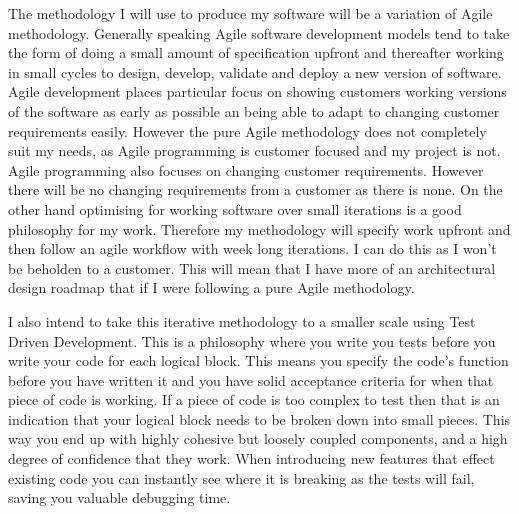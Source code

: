 The methodology I will use to produce my software will be a variation of
Agile methodology. Generally speaking Agile software development models tend to take
the form of doing a small amount of specification upfront and thereafter working
in small cycles to design, develop, validate and deploy a new version of
software. Agile development places particular focus on showing customers working
versions of the software as early as possible an being able to adapt to changing
customer requirements easily. \cite{fowler2001agile}
However the pure Agile methodology does not completely suit my needs, as Agile
programming is customer focused and my project is not. Agile programming also
focuses on changing customer requirements. However there will be no changing
requirements from a customer as there is none. On the other hand optimising for
working software over small iterations is a good philosophy for my work.
Therefore my methodology will specify work upfront and then follow an agile
workflow with week long iterations. I can do this as I won't be beholden to a
customer. This will mean that I have more of an architectural design roadmap
that if I were following a pure Agile methodology.

I also intend to take this iterative methodology to a smaller scale using Test
Driven Development. \cite{beck2003test} This is a philosophy where you write you
tests before you write your code for each logical block. This means you specify
the code's function before you have written it and you have solid acceptance
criteria for when that piece of code is working. If a piece of code is too
complex to test then that is an indication that your logical block needs to be
broken down into small pieces. This way you end up with highly cohesive but
loosely coupled components, and a high degree of confidence that they work.
When introducing new features that effect existing code you can instantly see
where it is breaking as the tests will fail, saving you valuable debugging time.

